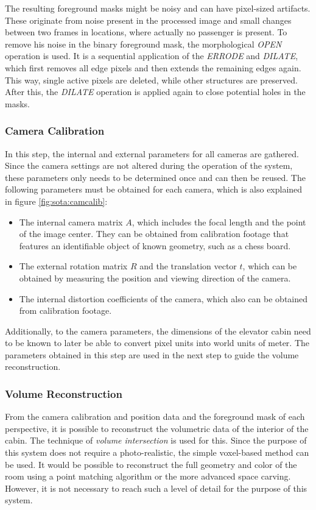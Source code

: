 The resulting foreground masks might be noisy and can have pixel-sized artifacts.
These originate from noise present in the processed image and small changes between two frames in locations, where actually no passenger is present. 
To remove his noise in the binary foreground mask, the morphological \emph{OPEN} operation is used. 
It is a sequential application of the \emph{ERRODE} and \emph{DILATE}, which first removes all edge pixels and then extends the remaining edges again.
This way, single active pixels are deleted, while other structures are preserved.
After this, the \emph{DILATE} operation is applied again to close potential holes in the masks.

\subsubsection{Camera Calibration}
In this step, the internal and external parameters for all cameras are gathered.
Since the camera settings are not altered during the operation of the system, these parameters only needs to be determined once and can then be reused.
The following parameters must be obtained for each camera, which is also explained in figure \ref{fig:sota:camcalib}:
\begin{itemize}
    \item The internal camera matrix $ A $, which includes the focal length and the point of the image center. They can be obtained from calibration footage that features an identifiable object of known geometry, such as a chess board.
    \item The external rotation matrix $ R $ and the translation vector $ t $, which can be obtained by measuring the position and viewing direction of the camera.
    \item The internal distortion coefficients of the camera, which also can be obtained from calibration footage.
\end{itemize}

Additionally, to the camera parameters, the dimensions of the elevator cabin need to be known to later be able to convert pixel units into world units of meter.
The parameters obtained in this step are used in the next step to guide the volume reconstruction.

\subsubsection{Volume Reconstruction}

From the camera calibration and position data and the foreground mask of each perspective, 
it is possible to reconstruct the volumetric data of the interior of the cabin.
The technique of \emph{volume intersection} is used for this.
Since the purpose of this system does not require a photo-realistic, the simple voxel-based method can be used.
It would be possible to reconstruct the full geometry and color of the room using a point matching algorithm or the more advanced space carving. 
However, it is not necessary to reach such a level of detail for the purpose of this system.

